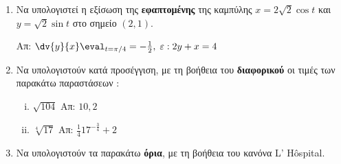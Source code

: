 \documentclass[a4paper,table]{report}
\begin{document}
\begin{enumerate}
  \item Να υπολογιστεί η εξίσωση της \textbf{εφαπτομένης} της καμπύλης 
    $ x=2 \sqrt{2} \cos{t} $ και $ y= \sqrt{2} \sin{t} $ στο σημείο $ (2,1) $.

    \hfill Απ: $ \dv{y}{x} \eval_{t= \pi /4} = - \frac{1}{2}, \; \varepsilon: 2y+x=4 $ 


  \item Να υπολογιστούν κατά προσέγγιση, με τη βοήθεια του \textbf{διαφορικού} οι τιμές 
    των παρακάτω παραστάσεων :
    \begin{enumerate}[i)]
      \item $\sqrt{104}$ \hfill Απ: $10,2$
      \item $\sqrt[4]{17}$ \hfill Απ: $\frac{1}{4}17^{-\frac{3}{4}}+2$
    \end{enumerate}

  \item Να υπολογιστούν τα παρακάτω \textbf{όρια}, με τη βοήθεια του κανόνα
    \textcolor{Col1}{L' H\^{o}spital}.
    \begin{enumerate}[(i)]
    \end{enumerate}


\end{enumerate}
\end{document}
